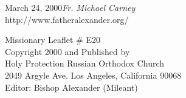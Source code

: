 \vspace{\baselineskip}

\begin{flushright}\noindent
March 24, 2000\hfill {\it Fr. Michael Carney}\\
http://www.fatheralexander.org/
\end{flushright}

\vspace{\baselineskip}
\vspace{\baselineskip}

{\small \noindent Missionary Leaflet \# E20\\
Copyright 2000 and Published by\\
Holy Protection Russian Orthodox Church\\
2049 Argyle Ave. Los Angeles, California 90068\\
Editor: Bishop Alexander (Mileant)}

